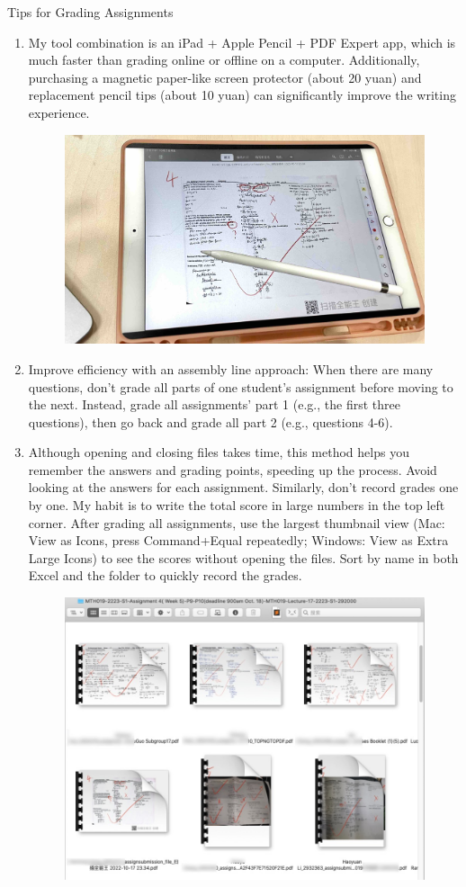 \emptyline
Tips for Grading Assignments
\begin{enumerate}
    \item My tool combination is an iPad + Apple Pencil + PDF Expert app, which is much faster than grading online or offline on a computer. Additionally, purchasing a magnetic paper-like screen protector (about 20 yuan) and replacement pencil tips (about 10 yuan) can significantly improve the writing experience.
        \begin{figure}[H]
            \centering
            \includegraphics[width=0.5\columnwidth]{author-folder/Kai.Wu/marking_tools.jpg}
        \end{figure}
    \item Improve efficiency with an assembly line approach: When there are many questions, don’t grade all parts of one student’s assignment before moving to the next. Instead, grade all assignments’ part 1 (e.g., the first three questions), then go back and grade all part 2 (e.g., questions 4-6).
    \item Although opening and closing files takes time, this method helps you remember the answers and grading points, speeding up the process. Avoid looking at the answers for each assignment.
Similarly, don’t record grades one by one. My habit is to write the total score in large numbers in the top left corner. After grading all assignments, use the largest thumbnail view (Mac: View as Icons, press Command+Equal repeatedly; Windows: View as Extra Large Icons) to see the scores without opening the files. Sort by name in both Excel and the folder to quickly record the grades.
        \begin{figure}[H]
            \centering
            \includegraphics[width=0.7\columnwidth]{author-folder/Kai.Wu/tongchengji.jpg}

\end{figure}
\end{enumerate}
